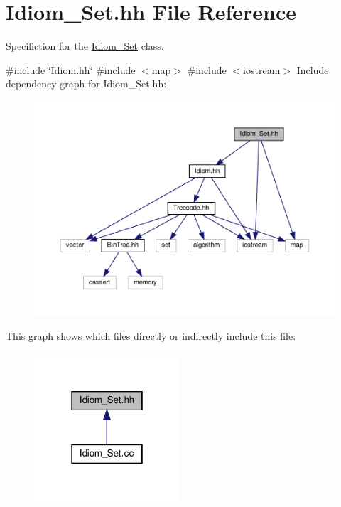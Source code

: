 \hypertarget{Idiom__Set_8hh}{}\section{Idiom\+\_\+\+Set.\+hh File Reference}
\label{Idiom__Set_8hh}


Specifiction for the \hyperlink{classIdiom__Set}{Idiom\+\_\+\+Set} class.  


{\ttfamily \#include \char`\"{}Idiom.\+hh\char`\"{}}\newline
{\ttfamily \#include $<$map$>$}\newline
{\ttfamily \#include $<$iostream$>$}\newline
Include dependency graph for Idiom\+\_\+\+Set.\+hh\+:
\nopagebreak
\begin{figure}[H]
\begin{center}
\leavevmode
\includegraphics[width=350pt]{Idiom__Set_8hh__incl}
\end{center}
\end{figure}
This graph shows which files directly or indirectly include this file\+:
\nopagebreak
\begin{figure}[H]
\begin{center}
\leavevmode
\includegraphics[width=154pt]{Idiom__Set_8hh__dep__incl}
\end{center}
\end{figure}
